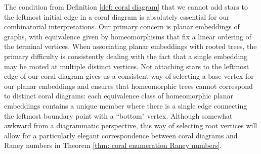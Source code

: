 \documentclass[documentfleqn,12pt]{amsart}
\begin{document}

The condition from Definition \ref{def: coral diagram} that we cannot add stars to the leftmost initial edge in a coral diagram is absolutely essential for our combinatorial interpretations.  Our primary concern is planar embeddings of graphs, with equivalence given by homeomorphisms that fix a linear ordering of the terminal vertices.  When associating planar embeddings with rooted trees, the primary difficulty is consistently dealing with the fact that a single embedding may be rooted at multiple distinct vertices.  Not attaching stars to the leftmost edge of our coral diagram gives us a consistent way of selecting a base vertex for our planar embeddings and ensures that homeomorphic trees cannot correspond to distinct coral diagrams: each equivalence class of homeomorphic planar embeddings contains a unique member where there is a single edge connecting the leftmost boundary point with a ``bottom" vertex.  Although somewhat awkward from a diagrammatic perspective, this way of selecting root vertices will allow for a particularly elegant correspondence between coral diagrams and Raney numbers in Theorem \ref{thm: coral enumeration Raney numbers}.
\end{document}
